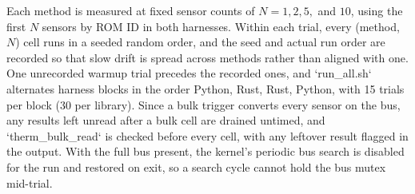 \documentclass[conference]{IEEEtran}
\begin{document}
Each method is measured at fixed sensor counts of $N = 1, 2, 5,$ and $10$, using the first $N$ sensors by ROM ID in both harnesses. 
Within each trial, every (method, $N$) cell runs in a seeded random order, and the seed and actual run order are recorded so that slow drift is spread across methods rather than aligned with one. 
One unrecorded warmup trial precedes the recorded ones, and `run\_all.sh` alternates harness blocks in the order Python, Rust, Rust, Python, with 15 trials per block (30 per library). 
Since a bulk trigger converts every sensor on the bus, any results left unread after a bulk cell are drained untimed, and `therm\_bulk\_read` is checked before every cell, with any leftover result flagged in the output. 
With the full bus present, the kernel's periodic bus search is disabled for the run and restored on exit, so a search cycle cannot hold the bus mutex mid-trial. 

\end{document}
